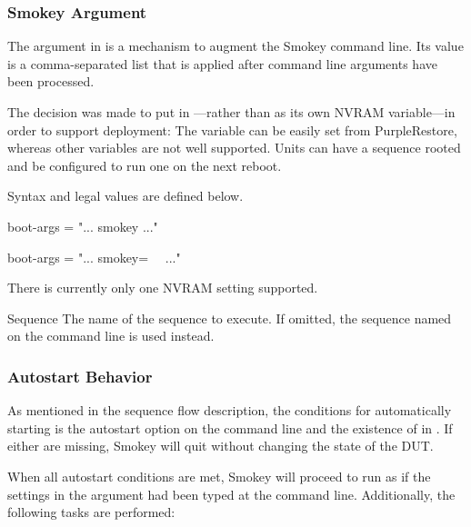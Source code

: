 \subsubsection{Smokey Argument}

The  argument in  is a mechanism to augment the
Smokey command line.  Its value is a comma-separated list that is applied after
command line arguments have been processed.

The decision was made to put  in ---rather than
as its own NVRAM variable---in order to support deployment:  The
 variable can be easily set from PurpleRestore, whereas other
variables are not well supported.  Units can have a sequence rooted and be
configured to run one on the next reboot.

Syntax and legal values are defined below.

\begin{Setting}
boot-args = "... smokey ..."
\end{Setting}

\begin{Setting}
boot-args = "... smokey=~~ ..."
\end{Setting}

There is currently only one NVRAM setting supported.

\begin{Definition}

\item[Sequence] The name of the sequence to execute.  If omitted, the sequence
named on the command line is used instead.

\end{Definition}

\subsubsection{Autostart Behavior}

As mentioned in the sequence flow description, the conditions for automatically
starting is the autostart option on the command line and the existence of
 in .  If either are missing, Smokey will quit
without changing the state of the DUT.

When all autostart conditions are met, Smokey will proceed to run as if the
settings in the  argument had been typed at the command line.
Additionally, the following tasks are performed:

